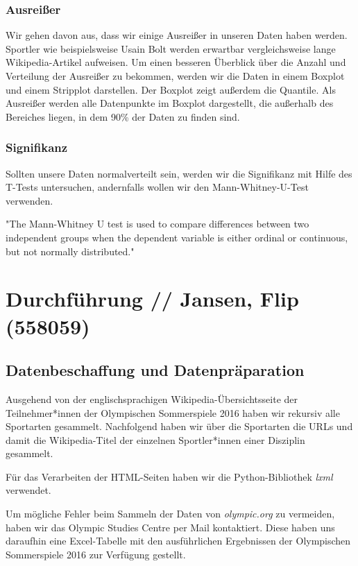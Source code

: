 \documentclass[11pt]{article}
\begin{document}
\subsubsection {Ausreißer}
Wir gehen davon aus, dass wir einige Ausreißer in unseren Daten haben werden. Sportler wie beispielsweise Usain Bolt werden erwartbar vergleichsweise lange Wikipedia-Artikel aufweisen. Um einen besseren Überblick über die Anzahl und Verteilung der Ausreißer zu bekommen, werden wir die Daten in einem Boxplot und einem Stripplot darstellen. Der Boxplot zeigt außerdem die Quantile. Als Ausreißer werden alle Datenpunkte im Boxplot dargestellt, die außerhalb des Bereiches liegen, in dem 90\% der Daten zu finden sind.

\subsubsection {Signifikanz}
Sollten unsere Daten normalverteilt sein, werden wir die Signifikanz mit Hilfe des T-Tests untersuchen, andernfalls wollen wir den Mann-Whitney-U-Test verwenden. 

"The Mann-Whitney U test is used to compare differences between two independent groups when the dependent variable is either ordinal or continuous, but not normally distributed." \parencite{LundResearchLtd}


\section {Durchführung // Jansen, Flip (558059)}

\subsection {Datenbeschaffung und Datenpräparation}
Ausgehend von der englischsprachigen Wikipedia-Übersichtsseite der Teilnehmer*innen der Olympischen Sommerspiele 2016 \parencite{wikiOlympicComp} haben wir rekursiv alle Sportarten gesammelt. Nachfolgend haben wir über die Sportarten die URLs und damit die Wikipedia-Titel der einzelnen Sportler*innen einer Disziplin gesammelt. 

Für das Verarbeiten der HTML-Seiten haben wir die Python-Bibliothek \textit{lxml} \parencite{lxml} verwendet.

Um mögliche Fehler beim Sammeln der Daten von \textit{olympic.org} zu vermeiden, haben wir das Olympic Studies Centre per Mail kontaktiert. Diese haben uns daraufhin eine Excel-Tabelle mit den ausführlichen Ergebnissen der Olympischen Sommerspiele 2016 zur Verfügung gestellt.
\end{document}
